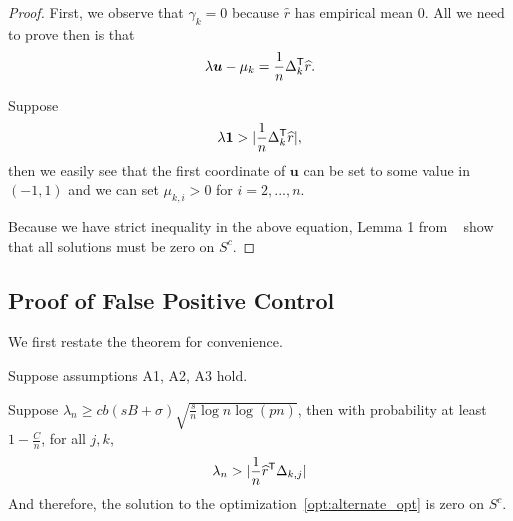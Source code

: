 \begin{proof}
First, we observe that $\gamma_k = 0$ because $\hat{r}$ has empirical mean 0. All we need to prove then is that 
\[
\lambda \mbox{\boldmath $u$} - \mu_k = \frac{1}{n} \Delta_k^{\mathsf{T}} \widehat{r}.
\]

Suppose
\[
\lambda \mbox{\boldmath $1$} > |\frac{1}{n} \Delta_k^{\mathsf{T}}\widehat{r}|,
\]
then we easily see that the first coordinate of $\mathbf{u}$ can be set to some value in $(-1,1)$ and we can set $\mu_{k,i} > 0$ for $i=2,...,n$. 

Because we have strict inequality in the above equation, Lemma 1 from ~\cite{Wain:09a} show that all solutions must be zero on $S^c$.
\end{proof}
 
 
 
 
 
 
 \subsection{Proof of False Positive Control}
 \label{sec:false_positive_proof}
 
 We first restate the theorem for convenience.
 
 
\begin{theorem} 
Suppose assumptions A1, A2, A3 hold. 

Suppose $\lambda_n \geq c b (sB + \sigma) \sqrt{ \frac{s}{n} \log n \log (pn)}$, then with probability at least $ 1 - \frac{C}{n}$, for all $j,k$,
\[
\lambda_n >  | \frac{1}{n} \widehat{r}^{\mathsf{T}} \Delta_{k,j}|
\]
And therefore, the solution to the optimization~\ref{opt:alternate_opt} is zero on $S^c$.
\end{theorem}


